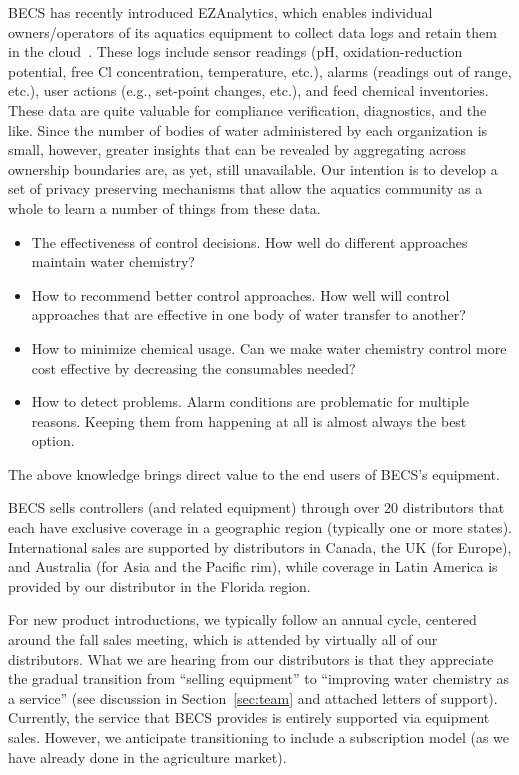 BECS has recently introduced EZAnalytics\texttrademark{}, which enables
individual owners/operators of its aquatics equipment to collect data
logs and retain them in the cloud~\cite{ccgss17}.
These logs include sensor readings (pH, oxidation-reduction potential, free Cl
concentration, temperature, etc.), alarms (readings out of range, etc.),
user actions (e.g., set-point changes, etc.), and feed chemical inventories.
These data are quite valuable for compliance verification, diagnostics,
and the like.  Since the number of bodies of water administered by each
organization is small, however, greater insights that can be revealed
by aggregating across ownership boundaries are, as yet, still unavailable.
Our intention is to develop a set of privacy preserving mechanisms that allow
the aquatics community as a whole to learn a number of things from these
data.
\begin{itemize}
\item The effectiveness of control decisions.  How well do different approaches
maintain water chemistry?
\item How to recommend better control approaches. How well will control
approaches that are effective in one body of water transfer to another?
\item How to minimize chemical usage. Can we make water chemistry control
more cost effective by decreasing the consumables needed?
\item How to detect problems. Alarm conditions are problematic for multiple
reasons.  Keeping them from happening at all is almost always the best option.
\end{itemize}
The above knowledge brings direct value to the end users of BECS's equipment.

BECS sells controllers (and related equipment) through over 20
distributors that each have exclusive coverage in a geographic region
(typically one or more states).
International sales are supported by distributors in Canada,
the UK (for Europe), and Australia (for Asia and the Pacific rim),
while coverage in Latin America is provided by our distributor in the
Florida region.

For new product introductions, we typically follow an annual cycle,
centered around the fall sales meeting, which is attended by virtually
all of our distributors.  What we are hearing from our distributors
is that they appreciate the gradual transition from ``selling equipment''
to ``improving water chemistry as a service'' (see discussion in
Section~\ref{sec:team} and attached letters of support).
Currently, the service that BECS provides is entirely supported via
equipment sales.  However, we anticipate transitioning to include a
subscription model (as we have already done in the agriculture market).


